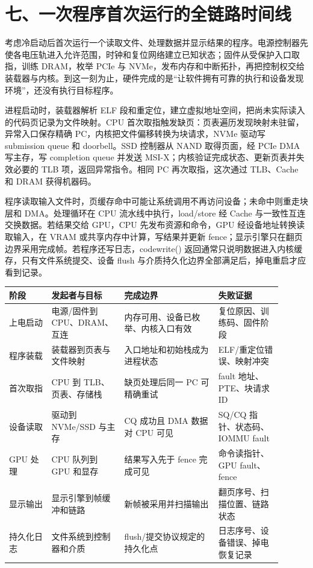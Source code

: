 \section{七、一次程序首次运行的全链路时间线}

考虑冷启动后首次运行一个读取文件、处理数据并显示结果的程序。电源控制器先使各电压轨进入允许范围，时钟和复位网络建立已知状态；固件从受保护入口取指，训练 DRAM，枚举 PCIe 与 NVMe，发布内存和中断拓扑，再把控制权交给装载器与内核。到这一刻为止，硬件完成的是“让软件拥有可靠的执行和设备发现环境”，还没有执行目标程序。

进程启动时，装载器解析 ELF 段和重定位，建立虚拟地址空间，把尚未实际读入的代码页记录为文件映射。CPU 首次取指触发缺页：页表遍历发现映射未驻留，异常入口保存精确 PC，内核把文件偏移转换为块请求，NVMe 驱动写 submission queue 和 doorbell。SSD 控制器从 NAND 取得页面，经 PCIe DMA 写主存，写 completion queue 并发送 MSI-X；内核验证完成状态、更新页表并失效必要的 TLB 项，返回异常指令。相同 PC 再次取指，这次通过 TLB、Cache 和 DRAM 获得机器码。

程序读取输入文件时，页缓存命中可能让系统调用不再访问设备；未命中则重走块层和 DMA。处理循环在 CPU 流水线中执行，load/store 经 Cache 与一致性互连交换数据。若结果交给 GPU，CPU 先发布资源和命令，GPU 经设备地址转换读取输入，在 VRAM 或共享内存中计算，写结果并更新 fence；显示引擎只在翻页边界采用完成帧。若程序还写日志，code{write()} 返回通常只说明数据进入内核缓存，只有文件系统提交、设备 flush 与介质持久化边界全部满足后，掉电重启才应看到记录。

\begin{longtable}{L{0.14\linewidth}L{0.24\linewidth}L{0.31\linewidth}L{0.21\linewidth}}
\toprule
阶段 & 发起者与目标 & 完成边界 & 失败证据 \\
\midrule
上电启动 & 电源/固件到 CPU、DRAM、互连 & 内存可用、设备已枚举、内核入口有效 & 复位原因、训练码、固件阶段 \\\tablerowrule
程序装载 & 装载器到页表与文件映射 & 入口地址和初始栈成为进程状态 & ELF/重定位错误、映射冲突 \\\tablerowrule
首次取指 & CPU 到 TLB、页表、存储栈 & 缺页处理后同一 PC 可精确重试 & fault 地址、PTE、块请求 ID \\\tablerowrule
设备读取 & 驱动到 NVMe/SSD 与主存 & CQ 成功且 DMA 数据对 CPU 可见 & SQ/CQ 指针、状态码、IOMMU fault \\\tablerowrule
GPU 处理 & CPU 队列到 GPU 和显存 & 结果写入先于 fence 完成可见 & 命令读指针、GPU fault、fence \\\tablerowrule
显示输出 & 显示引擎到帧缓冲和链路 & 新帧被采用并扫描输出 & 翻页序号、扫描位置、链路状态 \\\tablerowrule
持久化日志 & 文件系统到控制器和介质 & flush/提交协议规定的持久化点 & 日志序号、设备错误、掉电恢复记录 \\
\bottomrule
\end{longtable}

